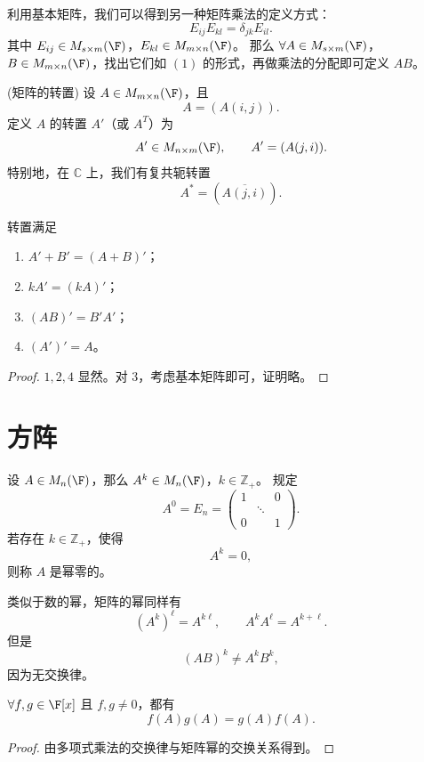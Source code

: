 利用基本矩阵，我们可以得到另一种矩阵乘法的定义方式：
\[
E_{ij}E_{kl}=\delta_{jk}E_{il}.
\]
其中 $E_{ij}\in M_{s\times m}(\F)$，$E_{kl}\in M_{m\times n}(\F)$。
那么 $\forall A\in M_{s\times m}(\F)$，$B\in M_{m\times n}(\F)$，找出它们如 $(1)$ 的形式，再做乘法的分配即可定义 $AB$。
\begin{definition}(矩阵的转置)
	设 $A\in M_{m\times n}(\F)$，且
	\[
	A=(A(i,j)).
	\]
	定义 $A$ 的转置 $A'$（或 $A^T$）为
	\[
	A'\in M_{n\times m}(\F),
	\qquad
	A'=(A(j,i)).
	\]
	特别地，在 $\mathbb C$ 上，我们有复共轭转置
	\[
	A^*=(\overline{A(j,i)}).
	\]
\end{definition}

\begin{proposition}[转置的性质]
	转置满足
	\begin{enumerate}
		\item $A'+B'=(A+B)'$；
		\item $kA'=(kA)'$；
		\item $(AB)'=B'A'$；
		\item $(A')'=A$。
	\end{enumerate}
\end{proposition}

\begin{proof}
	$1,2,4$ 显然。对 $3$，考虑基本矩阵即可，证明略。
\end{proof}


\section{方阵}

\begin{definition}
	设 $A\in M_n(\F)$，那么 $A^k\in M_n(\F)$，$k\in\mathbb Z_+$。
	规定
	\[
	A^0=E_n=
	\begin{pmatrix}
		1&&0\\
		&\ddots&\\
		0&&1
	\end{pmatrix}.
	\]
	若存在 $k\in\mathbb Z_+$，使得
	\[
	A^k=0,
	\]
	则称 $A$ 是幂零的。
	
\end{definition}
类似于数的幂，矩阵的幂同样有
\[
(A^k)^\ell=A^{k\ell},
\qquad
A^kA^\ell=A^{k+\ell}.
\]
但是
\[
(AB)^k\neq A^kB^k,
\]
因为无交换律。
\begin{proposition}
	$\forall f,g\in\F[x]$ 且 $f,g\neq0$，都有
	\[
	f(A)g(A)=g(A)f(A).
	\]
\end{proposition}

\begin{proof}
	由多项式乘法的交换律与矩阵幂的交换关系得到。
\end{proof}

